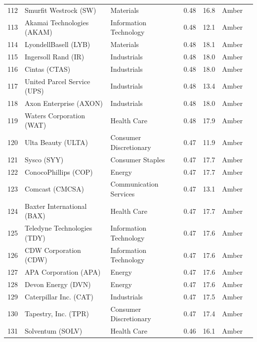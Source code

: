 \documentclass[11pt,a4paper]{article}
\begin{document}
{\begin{longtable}{r p{4.4cm} p{2.8cm} r r l l}
112 & Smurfit Westrock (SW) & Materials & 0.48 & 16.8 & \cellcolor[HTML]{FFEB9C}Amber &  \\
113 & Akamai Technologies (AKAM) & Information Technology & 0.48 & 12.1 & \cellcolor[HTML]{FFEB9C}Amber &  \\
114 & LyondellBasell (LYB) & Materials & 0.48 & 18.1 & \cellcolor[HTML]{FFEB9C}Amber &  \\
115 & Ingersoll Rand (IR) & Industrials & 0.48 & 18.0 & \cellcolor[HTML]{FFEB9C}Amber &  \\
116 & Cintas (CTAS) & Industrials & 0.48 & 18.0 & \cellcolor[HTML]{FFEB9C}Amber &  \\
117 & United Parcel Service (UPS) & Industrials & 0.48 & 13.4 & \cellcolor[HTML]{FFEB9C}Amber &  \\
118 & Axon Enterprise (AXON) & Industrials & 0.48 & 18.0 & \cellcolor[HTML]{FFEB9C}Amber &  \\
119 & Waters Corporation (WAT) & Health Care & 0.48 & 17.9 & \cellcolor[HTML]{FFEB9C}Amber &  \\
120 & Ulta Beauty (ULTA) & Consumer Discretionary & 0.47 & 11.9 & \cellcolor[HTML]{FFEB9C}Amber &  \\
121 & Sysco (SYY) & Consumer Staples & 0.47 & 17.7 & \cellcolor[HTML]{FFEB9C}Amber &  \\
122 & ConocoPhillips (COP) & Energy & 0.47 & 17.7 & \cellcolor[HTML]{FFEB9C}Amber &  \\
123 & Comcast (CMCSA) & Communication Services & 0.47 & 13.1 & \cellcolor[HTML]{FFEB9C}Amber &  \\
124 & Baxter International (BAX) & Health Care & 0.47 & 17.7 & \cellcolor[HTML]{FFEB9C}Amber &  \\
125 & Teledyne Technologies (TDY) & Information Technology & 0.47 & 17.6 & \cellcolor[HTML]{FFEB9C}Amber &  \\
126 & CDW Corporation (CDW) & Information Technology & 0.47 & 17.6 & \cellcolor[HTML]{FFEB9C}Amber &  \\
127 & APA Corporation (APA) & Energy & 0.47 & 17.6 & \cellcolor[HTML]{FFEB9C}Amber &  \\
128 & Devon Energy (DVN) & Energy & 0.47 & 17.6 & \cellcolor[HTML]{FFEB9C}Amber &  \\
129 & Caterpillar Inc. (CAT) & Industrials & 0.47 & 17.5 & \cellcolor[HTML]{FFEB9C}Amber &  \\
130 & Tapestry, Inc. (TPR) & Consumer Discretionary & 0.47 & 17.4 & \cellcolor[HTML]{FFEB9C}Amber &  \\
131 & Solventum (SOLV) & Health Care & 0.46 & 16.1 & \cellcolor[HTML]{FFEB9C}Amber &  \\

\end{longtable}}
\end{document}
